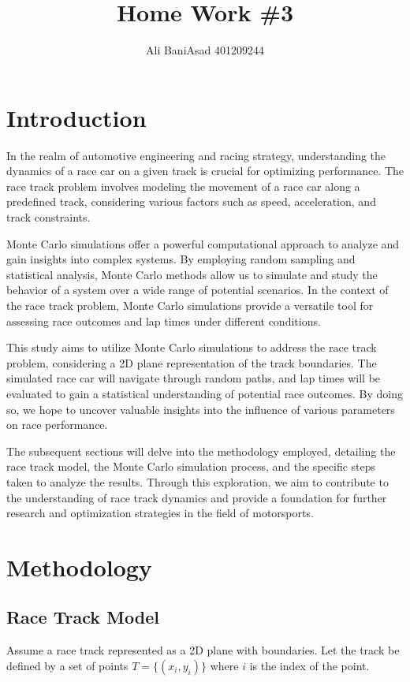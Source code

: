 \documentclass{article}
\title{Home Work \#3}
\author{Ali BaniAsad 401209244}
\begin{document}
	\maketitle
\section{Introduction}
In the realm of automotive engineering and racing strategy, understanding the dynamics of a race car on a given track is crucial for optimizing performance. The race track problem involves modeling the movement of a race car along a predefined track, considering various factors such as speed, acceleration, and track constraints.

Monte Carlo simulations offer a powerful computational approach to analyze and gain insights into complex systems. By employing random sampling and statistical analysis, Monte Carlo methods allow us to simulate and study the behavior of a system over a wide range of potential scenarios. In the context of the race track problem, Monte Carlo simulations provide a versatile tool for assessing race outcomes and lap times under different conditions.

This study aims to utilize Monte Carlo simulations to address the race track problem, considering a 2D plane representation of the track boundaries. The simulated race car will navigate through random paths, and lap times will be evaluated to gain a statistical understanding of potential race outcomes. By doing so, we hope to uncover valuable insights into the influence of various parameters on race performance.

The subsequent sections will delve into the methodology employed, detailing the race track model, the Monte Carlo simulation process, and the specific steps taken to analyze the results. Through this exploration, we aim to contribute to the understanding of race track dynamics and provide a foundation for further research and optimization strategies in the field of motorsports.


\section{Methodology}

\subsection{Race Track Model}
Assume a race track represented as a 2D plane with boundaries. Let the track be defined by a set of points $T = \{(x_i, y_i)\}$ where $i$ is the index of the point.
\end{document}
